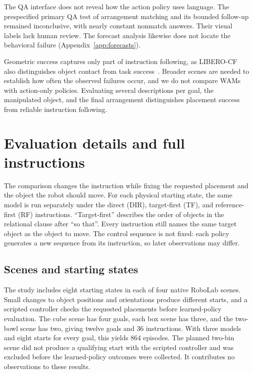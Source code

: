 \documentclass{article}
\begin{document}
The QA interface does not reveal how the action policy uses language. The prespecified primary QA test of arrangement matching and its bounded follow-up remained inconclusive, with nearly constant nonmatch answers. Their visual labels lack human review. The forecast analysis likewise does not locate the behavioral failure (Appendix~\ref{app:forecasts}).

Geometric success captures only part of instruction following, as LIBERO-CF also distinguishes object contact from task success~\citep{fang2026counterfactual}. Broader scenes are needed to establish how often the observed failures occur, and we do not compare WAMs with action-only policies. Evaluating several descriptions per goal, the manipulated object, and the final arrangement distinguishes placement success from reliable instruction following.

\clearpage

\clearpage
\appendix

\setlength{\parskip}{5.5pt}
\section{Evaluation details and full instructions}
\label{app:tasks}
The comparison changes the instruction while fixing the requested placement and the object the robot should move. For each physical starting state, the same model is run separately under the direct (DIR), target-first (TF), and reference-first (RF) instructions. ``Target-first'' describes the order of objects in the relational clause after ``so that''. Every instruction still names the same target object as the object to move. The control sequence is not fixed: each policy generates a new sequence from its instruction, so later observations may differ.

\subsection{Scenes and starting states}
The study includes eight starting states in each of four native RoboLab scenes. Small changes to object positions and orientations produce different starts, and a scripted controller checks the requested placements before learned-policy evaluation. The cube scene has four goals, each box scene has three, and the two-bowl scene has two, giving twelve goals and 36 instructions. With three models and eight starts for every goal, this yields 864 episodes. The planned two-bin scene did not produce a qualifying start with the scripted controller and was excluded before the learned-policy outcomes were collected. It contributes no observations to these results.
\end{document}
